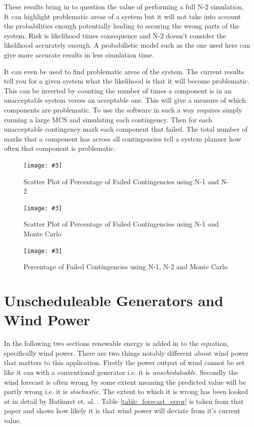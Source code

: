 \documentclass[a4paper,oneside,12pt]{report}
\newcommand{\image}[3] {
  \begin{figure}
    \begin{center}
      \texttt{[image: \#3]}
      \caption{#2}
      \label{#1}
    \end{center}
  \end{figure}
}
\begin{document}
These results bring in to question the value of performing a full N-2 simulation. It can highlight problematic areas of a system but it will not take into account the probabilities enough potentially leading to securing the wrong parts of the system. Risk is likelihood times consequence and N-2 doesn't consider the likelihood accurately enough. A probabilistic model such as the one used here can give more accurate results in less simulation time. 

It can even be used to find problematic areas of the system. The current results tell you for a given system what the likelihood is that it will become problematic. This can be inverted by counting the number of times a component is in an unacceptable system verses an acceptable one. This will give a measure of which components are problematic. To use the software in such a way requires simply running a large MCS and simulating each contingency. Then for each unacceptable contingency mark each component that failed. The total number of marks that a component has across all contingencies tell a system planner how often that component is problematic. 

\image{scatter-n1-n2}{Scatter Plot of Percentage of Failed Contingencies using N-1 and N-2}{scatter-n1-n2.png}
\image{scatter-mc-n2}{Scatter Plot of Percentage of Failed Contingencies using N-1 and Monte Carlo}{scatter-mc-n2.png}
\image{mc-n1-n2}{Percentage of Failed Contingencies using N-1, N-2 and Monte Carlo}{mc-n1-n2.png}
\clearpage

\section{Unscheduleable Generators and Wind Power}

In the following two sections renewable energy is added in to the equation, specifically wind power. There are two things notably different about wind power that matters to this application. Firstly the power output of wind cannot be set like it can with a conventional generator i.e. it is \emph{unscheduleable}. Secondly the wind forecast is often wrong by some extent meaning the predicted value will be partly wrong i.e. it is \emph{stochastic}. The extent to which it is wrong has been looked at in detail by Bathurst et. al. \cite{Bathurst2002}. Table \ref{table_forecast_error} is taken from that paper and shows how likely it is that wind power will deviate from it's current value. 
\end{document}
